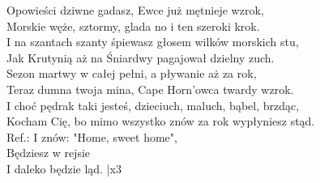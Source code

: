 Opowieści dziwne gadasz, Ewce już mętnieje wzrok, \\
Morskie węże, sztormy, glada no i ten szeroki krok. \\
I na szantach szanty śpiewasz głosem wilków morskich stu, \\
Jak Krutynią aż na Śniardwy pagajował dzielny zuch. \\

Sezon martwy w całej pełni, a pływanie aż za rok, \\
Teraz dumna twoja mina, Cape Horn'owca twardy wzrok. \\
I choć pędrak taki jesteś, dzieciuch, maluch, bąbel, brzdąc, \\
Kocham Cię, bo mimo wszystko znów za rok wypłyniesz stąd. \\

Ref.: I znów: "Home, sweet home", \\
Będziesz w rejsie \\
I daleko będzie ląd.  |x3 \\